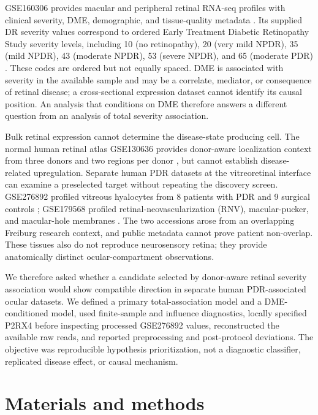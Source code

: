 \documentclass[12pt]{article}
\begin{document}
GSE160306 provides macular and peripheral retinal RNA-seq profiles with clinical severity, DME, demographic, and tissue-quality metadata \citep{Becker2021,GSE160306}. Its supplied DR severity values correspond to ordered Early Treatment Diabetic Retinopathy Study severity levels, including 10 (no retinopathy), 20 (very mild NPDR), 35 (mild NPDR), 43 (moderate NPDR), 53 (severe NPDR), and 65 (moderate PDR) \citep{ASRS2020}. These codes are ordered but not equally spaced. DME is associated with severity in the available sample and may be a correlate, mediator, or consequence of retinal disease; a cross-sectional expression dataset cannot identify its causal position. An analysis that conditions on DME therefore answers a different question from an analysis of total severity association.

Bulk retinal expression cannot determine the disease-state producing cell. The normal human retinal atlas GSE130636 provides donor-aware localization context from three donors and two regions per donor \citep{Voigt2019,GSE130636}, but cannot establish disease-related upregulation. Separate human PDR datasets at the vitreoretinal interface can examine a preselected target without repeating the discovery screen. GSE276892 profiled vitreous hyalocytes from 8 patients with PDR and 9 surgical controls \citep{Wolf2024Hyalocytes,GSE276892}; GSE179568 profiled retinal-neovascularization (RNV), macular-pucker, and macular-hole membranes \citep{Boneva2021,GSE179568}. The two accessions arose from an overlapping Freiburg research context, and public metadata cannot prove patient non-overlap. These tissues also do not reproduce neurosensory retina; they provide anatomically distinct ocular-compartment observations.

We therefore asked whether a candidate selected by donor-aware retinal severity association would show compatible direction in separate human PDR-associated ocular datasets. We defined a primary total-association model and a DME-conditioned model, used finite-sample and influence diagnostics, locally specified P2RX4 before inspecting processed GSE276892 values, reconstructed the available raw reads, and reported preprocessing and post-protocol deviations. The objective was reproducible hypothesis prioritization, not a diagnostic classifier, replicated disease effect, or causal mechanism.

\section{Materials and methods}
\end{document}
